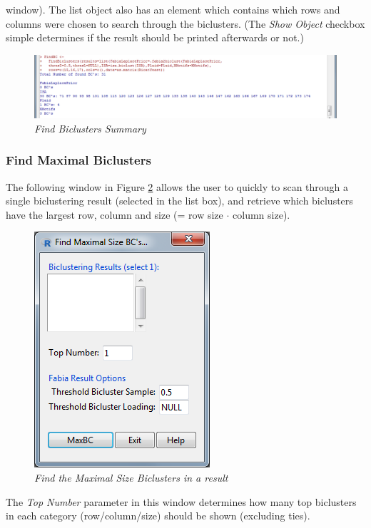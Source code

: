 \documentclass[a4paper]{article}\usepackage[]{graphicx}\usepackage[]{color}
\begin{document}
window). The list object also has an element which contains which rows and
columns were chosen to search through the biclusters.
(The {\it Show Object} checkbox simple determines if the result should be
printed afterwards or not.)
\begin{figure}[H]
\centering
\includegraphics[scale=0.4]{figures/findwindow_example1.png}
\caption{{\it Find Biclusters Summary}\label{findwindow_example1}}
\end{figure}


\subsubsection{Find Maximal Biclusters}

The following window in Figure \ref{maxbc} allows the user to quickly to scan through a single biclustering result (selected in the list box), and retrieve which biclusters have the largest row, column and size (= row size $\cdot$ column size). 

\begin{figure}[H]
\centering
\includegraphics[scale=0.4]{figures/MaxBC.png}
\caption{{\it Find the Maximal Size Biclusters in a result}\label{maxbc}}
\end{figure}

\noindent The {\it Top Number} parameter in this window determines how many top biclusters in each category (row/column/size) should be shown (excluding ties).
\end{document}
